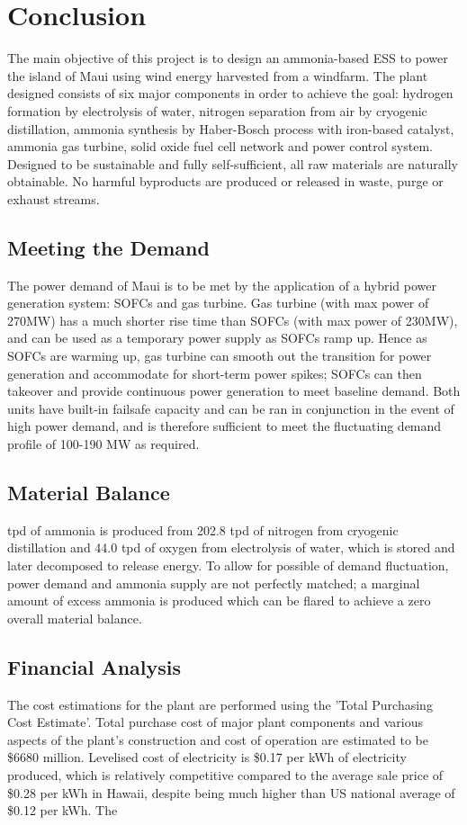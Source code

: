\documentclass[11pt,oneside]{article}
\begin{document}
\section{Conclusion}
\noindent The main objective of this project is to design an ammonia-based ESS to power the island of Maui using wind energy harvested from a windfarm.    The plant designed consists of six major components in order to achieve the goal: hydrogen formation by electrolysis of water, nitrogen separation from air by cryogenic distillation, ammonia synthesis by Haber-Bosch process with iron-based catalyst, ammonia gas turbine, solid oxide fuel cell network and power control system. Designed to be sustainable and fully self-sufficient, all raw materials are naturally obtainable. No harmful byproducts are produced or released in waste, purge or exhaust streams. 
\subsection{Meeting the Demand}
\noindent The power demand of Maui is to be met by the application of a hybrid power generation system: SOFCs and gas turbine. Gas turbine (with max power of 270MW) has a much shorter rise time than SOFCs (with max power of 230MW), and can be used as a temporary power supply as SOFCs ramp up. Hence as SOFCs are warming up, gas turbine can smooth out the transition for power generation and accommodate for short-term power spikes; SOFCs can then takeover and provide continuous power generation to meet baseline demand. Both units have built-in failsafe capacity and can be ran in conjunction in the event of high power demand, and is therefore sufficient to meet the fluctuating demand profile of 100-190 MW as required.
\subsection{Material Balance}
 tpd of ammonia is produced from 202.8 tpd of nitrogen from cryogenic distillation and 44.0 tpd of oxygen from electrolysis of water, which is stored and later decomposed to release energy. To allow for possible of demand fluctuation, power demand and ammonia supply are not perfectly matched; a marginal amount of excess ammonia is produced which can be flared to achieve a zero overall material balance.
\subsection{Financial Analysis}
The cost estimations for the plant are performed using the 'Total Purchasing Cost Estimate'. Total purchase cost of major plant components and various aspects of the plant's construction and cost of operation are estimated to be \$6680 million. Levelised cost of electricity is \$0.17 per kWh of electricity produced, which is relatively competitive compared to the average sale price of \$0.28 per kWh in Hawaii, despite being much higher than US national average of \$0.12 per kWh. The 
\end{document}
